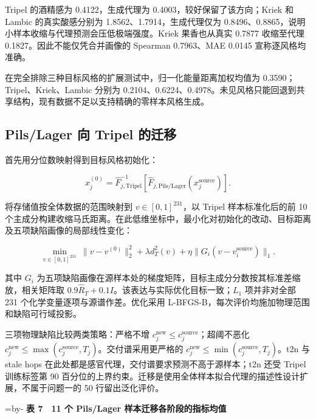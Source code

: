 \documentclass[
  chinese,
  11pt,
]{article}
\makeatletter
\newcommand{\EnsureSpace}[1]{\par\begingroup\@tempdima=\pagegoal\advance\@tempdima by-\pagetotal\ifdim\@tempdima<#1\newpage\fi\endgroup}
\makeatother
\begin{document}
Tripel 的酒精感为 0.4122，生成代理为 0.4003，较好保留了该方向；Kriek 和
Lambic 的真实酸感分别为 1.8562、1.7914，生成代理仅为
0.8496、0.8865，说明小样本收缩与代理预测会压低极端强度。Kriek
果香也从真实 0.7877 收缩至代理 0.1827。因此不能仅凭合并画像的 Spearman
0.7963、MAE 0.0145 宣称逐风格均准确。

在完全排除三种目标风格的扩展测试中，归一化能量距离加权均值为
0.3590；Tripel、Kriek、Lambic 分别为
0.2104、0.6224、0.4978。未见风格只能回退到共享结构，现有数据不足以支持精确的零样本风格生成。

\subsection{Pils/Lager 向 Tripel
的迁移}\label{pilslager-ux5411-tripel-ux7684ux8fc1ux79fb}

首先用分位数映射得到目标风格初始化：

\[
x_j^{(0)}=\widehat F_{j,\mathrm{Tripel}}^{-1}\!\left[\widehat F_{j,\mathrm{Pils/Lager}}(x_j^{\mathrm{source}})\right].
\]

将存储值按全体数据的范围映射到 \(v\in[0,1]^{231}\)，以 Tripel
样本标准化后的前 10
个主成分构建收缩马氏距离。在此低维坐标中，最小化对初始化的改动、目标距离及五项缺陷画像的局部线性变化：

\[
\min_{v\in[0,1]^{231}}\ \|v-v^{(0)}\|_2^2+\lambda d_T^2(v)
+\eta\|G_i(v-v_i^{\mathrm{source}})\|_1.
\]

其中 \(G_i\)
为五项缺陷画像在源样本处的梯度矩阵，目标主成分分数按其标准差缩放，相关矩阵取
\(0.9\widehat R_T+0.1I\)。该表达与实际优化目标一致；\(L_1\) 项并非对全部
231 个化学变量逐项与源谱作差。优化采用
L-BFGS-B，每次评价均施加物理范围和缺陷可行域投影。

三项物理缺陷比较两类策略：严格不增
\(c_j^{\mathrm{new}}\le c_j^{\mathrm{source}}\)；超阈不恶化
\(c_j^{\mathrm{new}}\le\max(c_j^{\mathrm{source}},T_j)\)。交付谱采用更严格的
\(c_j^{\mathrm{new}}\le\min(c_j^{\mathrm{source}},T_j)\)。t2n 与 stale
hops 在此处都是感官代理，交付谱要求预测不高于源样本；t2n 还受 Tripel
训练标签第 90
百分位的上界约束。迁移是使用全体样本拟合代理的描述性设计扩展，不属于问题一的
50 行留出泛化评价。

\EnsureSpace{6\baselineskip}
\textbf{表 7　11 个 Pils/Lager 样本迁移各阶段的指标均值}
\end{document}
